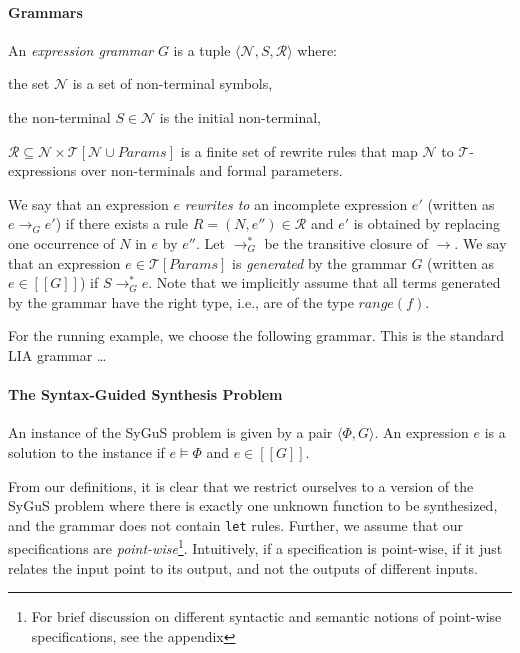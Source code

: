 \documentclass{llncs}
\newcommand\tuple[1]{\langle #1 \rangle}
\newcommand\Expr{e}
\newcommand\Spec{\Phi}
\newcommand\Grammar{G}
\newcommand\sem[1]{[\![ #1 ]\!]}
\newcommand\SynthFun{f}
\newcommand\range{\mathit{range}}
\newcommand\FormalParameters{\mathit{Params}}
\newcommand\NonTerminals{\mathcal{N}}
\newcommand\NonTerminal{N}
\newcommand\StartSymbol{S}
\newcommand\Rules{\mathcal{R}}
\newcommand\Rule{R}
\newcommand\Theory{\mathcal{T}}
\newcommand\RewritesTo{\rightarrow}
\begin{document}
\paragraph{Grammars}
An {\em expression grammar} $\Grammar$ is a tuple $\tuple {
\NonTerminals, \StartSymbol, \Rules }$ where:
\begin{inparaenum}[(a)]
\item the set $\NonTerminals$ is a set of non-terminal symbols,
\item the non-terminal $\StartSymbol \in \NonTerminals$ is the initial non-terminal,
\item $\Rules \subseteq \NonTerminals \times
  \Theory[\NonTerminals \cup \FormalParameters]$ is a finite set
  of rewrite rules that map $\NonTerminals$ to $\Theory$-expressions
  over non-terminals and formal parameters.
\end{inparaenum}
We say that an expression $\Expr$ {\em rewrites to} an incomplete
expression $\Expr'$ (written as $\Expr \RewritesTo_\Grammar \Expr'$) if
there exists a rule $\Rule = (\NonTerminal, \Expr'') \in \Rules$ and
$\Expr'$ is obtained by replacing one occurrence of $\NonTerminal$ in
$\Expr$ by $\Expr''$.
Let $\RewritesTo_\Grammar^*$ be the transitive closure of $\RewritesTo$.
We say that an expression $\Expr \in \Theory[\FormalParameters]$
is {\em generated} by the grammar $\Grammar$ (written as $\Expr \in
\sem{\Grammar}$) if $\StartSymbol \RewritesTo_\Grammar^* \Expr$.
Note that we implicitly assume that all terms generated by the grammar
have the right type, i.e., are of the type $\range(\SynthFun)$.

\begin{example}
  For the running example, we choose the following grammar.
  This is the standard LIA grammar \dots
\end{example}

\paragraph{The Syntax-Guided Synthesis Problem}
An instance of the SyGuS problem is given by a pair $\tuple { \Spec,
\Grammar }$.
An expression $\Expr$ is a solution to the instance if $\Expr \models
\Spec$ and $\Expr \in \sem{\Grammar}$.

From our definitions, it is clear that we restrict ourselves to a
version of the SyGuS problem where there is exactly one unknown function
to be synthesized, and the grammar does not contain {\tt let} rules.
Further, we assume that our specifications are {\em
  point-wise}\footnote{For brief discussion on different syntactic and
semantic notions of point-wise specifications, see the appendix}.
Intuitively, if a specification is point-wise, if it just relates the
input point to its output, and not the outputs of different inputs.
\end{document}
